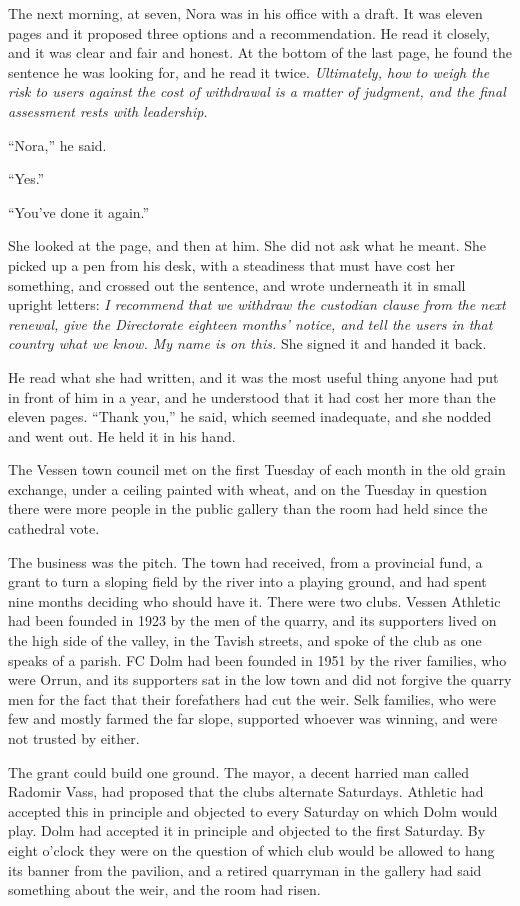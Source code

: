 The next morning, at seven, Nora was in his office with a draft. It was eleven pages and it proposed three options and a recommendation. He read it closely, and it was clear and fair and honest. At the bottom of the last page, he found the sentence he was looking for, and he read it twice. \emph{Ultimately, how to weigh the risk to users against the cost of withdrawal is a matter of judgment, and the final assessment rests with leadership.}

``Nora,'' he said.

``Yes.''

``You've done it again.''

She looked at the page, and then at him. She did not ask what he meant. She picked up a pen from his desk, with a steadiness that must have cost her something, and crossed out the sentence, and wrote underneath it in small upright letters: \emph{I recommend that we withdraw the custodian clause from the next renewal, give the Directorate eighteen months' notice, and tell the users in that country what we know. My name is on this.} She signed it and handed it back.

He read what she had written, and it was the most useful thing anyone had put in front of him in a year, and he understood that it had cost her more than the eleven pages. ``Thank you,'' he said, which seemed inadequate, and she nodded and went out. He held it in his hand.

\scenebreak
\noindent The Vessen town council met on the first Tuesday of each month in the old grain exchange, under a ceiling painted with wheat, and on the Tuesday in question there were more people in the public gallery than the room had held since the cathedral vote.

The business was the pitch. The town had received, from a provincial fund, a grant to turn a sloping field by the river into a playing ground, and had spent nine months deciding who should have it. There were two clubs. Vessen Athletic had been founded in 1923 by the men of the quarry, and its supporters lived on the high side of the valley, in the Tavish streets, and spoke of the club as one speaks of a parish. FC Dolm had been founded in 1951 by the river families, who were Orrun, and its supporters sat in the low town and did not forgive the quarry men for the fact that their forefathers had cut the weir. Selk families, who were few and mostly farmed the far slope, supported whoever was winning, and were not trusted by either.

The grant could build one ground. The mayor, a decent harried man called Radomir Vass, had proposed that the clubs alternate Saturdays. Athletic had accepted this in principle and objected to every Saturday on which Dolm would play. Dolm had accepted it in principle and objected to the first Saturday. By eight o'clock they were on the question of which club would be allowed to hang its banner from the pavilion, and a retired quarryman in the gallery had said something about the weir, and the room had risen.

